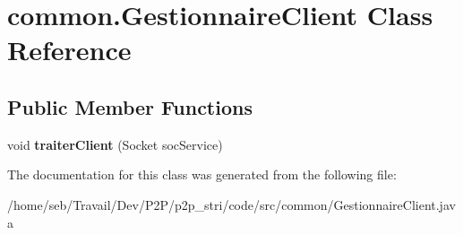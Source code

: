 \hypertarget{classcommon_1_1GestionnaireClient}{}\section{common.\+Gestionnaire\+Client Class Reference}
\label{classcommon_1_1GestionnaireClient}
\subsection*{Public Member Functions}
\begin{DoxyCompactItemize}
\item 
\mbox{\label{classcommon_1_1GestionnaireClient_ac4a3e1d8fcccc18b354132893e29aac6}} 
void {\bfseries traiter\+Client} (Socket soc\+Service)
\end{DoxyCompactItemize}


The documentation for this class was generated from the following file\+:\begin{DoxyCompactItemize}
\item 
/home/seb/\+Travail/\+Dev/\+P2\+P/p2p\+\_\+stri/code/src/common/Gestionnaire\+Client.\+java\end{DoxyCompactItemize}
